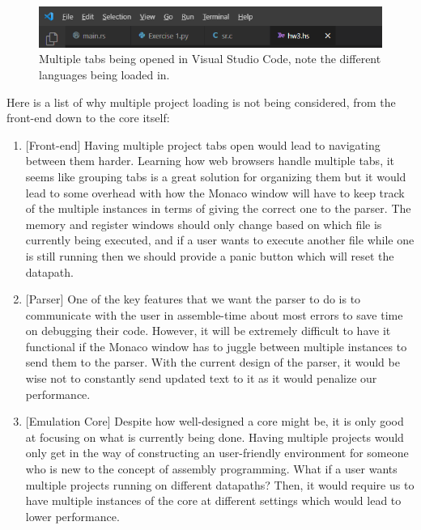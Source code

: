 \documentclass[
    paper=letter,
    parskip=half,
    fontsize=12pt,
    titlepage=firstiscover,
    toc=bibliography,
    numbers=endperiod
]{scrartcl}
\providecommand{\tightlist}{%
  \setlength{\itemsep}{0pt}\setlength{\parskip}{0pt}}
\begin{document}
\begin{figure}[H]
    \includegraphics[width=\textwidth]{vscode-tabs}
    \caption{Multiple tabs being opened in Visual Studio Code, note the different languages being loaded in.}
\end{figure}

Here is a list of why multiple project loading is not being considered,
from the front-end down to the core itself:

\begin{enumerate}
    \tightlist
    \item
          {[}Front-end{]} Having multiple project tabs open would lead to
          navigating between them harder. Learning how web browsers handle
          multiple tabs, it seems like grouping tabs is a great solution for
          organizing them but it would lead to some overhead with how the Monaco
          window will have to keep track of the multiple instances in terms of
          giving the correct one to the parser. The memory and register
          windows should only change based on which file is currently being
          executed, and if a user wants to execute another file while one is
          still running then we should provide a panic button which will
          reset the datapath.
    \item
          {[}Parser{]} One of the key features that we want the parser to do is
          to communicate with the user in assemble-time about most errors to save
          time on debugging their code. However, it will be extremely difficult
          to have it functional if the Monaco window has to juggle between
          multiple instances to send them to the parser. With the current design of
          the parser, it would be wise not to constantly send updated text to it
          as it would penalize our performance.
    \item
          {[}Emulation Core{]} Despite how well-designed a core might be, it is
          only good at focusing on what is currently being done. Having multiple
          projects would only get in the way of constructing an user-friendly
          environment for someone who is new to the concept of assembly
          programming. What if a user wants multiple projects running on
          different datapaths? Then, it would require us to have multiple
          instances of the core at different settings which would lead to lower
          performance.
\end{enumerate}
\end{document}
